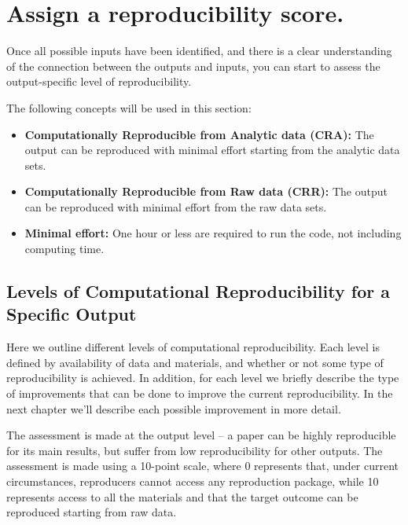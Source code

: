 \documentclass[]{book}
\begin{document}
\hypertarget{score}{%
\section{Assign a reproducibility score.}\label{score}}

Once all possible inputs have been identified, and there is a clear understanding of the connection between the outputs and inputs, you can start to assess the output-specific level of reproducibility.

The following concepts will be used in this section:

\begin{itemize}
\item
  \textbf{Computationally Reproducible from Analytic data (CRA):} The output can be reproduced with minimal effort starting from the analytic data sets.
\item
  \textbf{Computationally Reproducible from Raw data (CRR):} The output can be reproduced with minimal effort from the raw data sets.
\item
  \textbf{Minimal effort:} One hour or less are required to run the code, not including computing time.
\end{itemize}

\hypertarget{levels-of-computational-reproducibility-for-a-specific-output}{%
\subsection{Levels of Computational Reproducibility for a Specific Output}\label{levels-of-computational-reproducibility-for-a-specific-output}}

Here we outline different levels of computational reproducibility. Each level is defined by availability of data and materials, and whether or not some type of reproducibility is achieved. In addition, for each level we briefly describe the type of improvements that can be done to improve the current reproducibility. In the next chapter we'll describe each possible improvement in more detail.

The assessment is made at the output level -- a paper can be highly reproducible for its main results, but suffer from low reproducibility for other outputs. The assessment is made using a 10-point scale, where 0 represents that, under current circumstances, reproducers cannot access any reproduction package, while 10 represents access to all the materials and that the target outcome can be reproduced starting from raw data.
\end{document}
